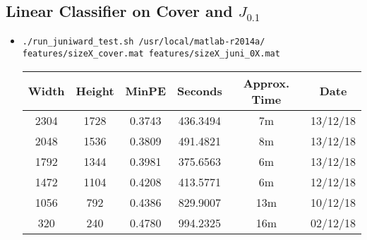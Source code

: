 \documentclass[11pt,a4paper]{report}
\newcommand{\Jtern}{\texorpdfstring{$J_{0.1}$}{J(0.1)}}
\begin{document}
\subsection{Linear Classifier on Cover and \Jtern} \label{j01-classifier}
\begin{itemize}
\item \texttt{./run\_juniward\_test.sh /usr/local/matlab-r2014a/} \\
         \texttt{features/sizeX\_cover.mat features/sizeX\_juni\_0X.mat}
  \begin{center}
  \begin{tabular}{ c c | c | c c c }
  Width & Height & MinPE & Seconds & Approx. Time & Date \\ \hline
  2304 & 1728 & 0.3743 & 436.3494 & 7m & 13/12/18 \\
  2048 & 1536 & 0.3809 & 491.4821 & 8m & 13/12/18 \\
  1792 & 1344 & 0.3981 & 375.6563 & 6m & 13/12/18 \\
  1472 & 1104 & 0.4208 & 413.5771 & 6m & 12/12/18 \\
  1056 & 792 & 0.4386 & 829.9007 & 13m & 10/12/18 \\
  320 & 240 & 0.4780 & 994.2325 & 16m & 02/12/18 \\
  \end{tabular}
  \end{center}
\end{itemize}
\end{document}
